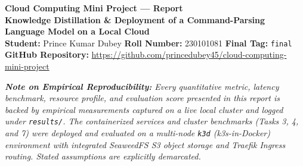 \documentclass[10pt,a4paper]{article}
\begin{document}
\begin{center}
    {\LARGE \textbf{Cloud Computing Mini Project --- Report}} \\[4pt]
    {\large \textbf{Knowledge Distillation \& Deployment of a Command-Parsing Language Model on a Local Cloud}} \\[6pt]
    \textbf{Student:} Prince Kumar Dubey \quad 
    \textbf{Roll Number:} 230101081 \quad 
    \textbf{Final Tag:} \texttt{final} \\[3pt]
    \textbf{GitHub Repository:} \url{https://github.com/princedubey45/cloud-computing-mini-project}
\end{center}

\vspace{0.1cm}
\noindent\textit{\textbf{Note on Empirical Reproducibility:} Every quantitative metric, latency benchmark, resource profile, and evaluation score presented in this report is backed by empirical measurements captured on a live local cluster and logged under \texttt{results/}. The containerized services and cluster benchmarks (Tasks 3, 4, and 7) were deployed and evaluated on a multi-node \texttt{k3d} (k3s-in-Docker) environment with integrated SeaweedFS S3 object storage and Traefik Ingress routing. Stated assumptions are explicitly demarcated.}

\vspace{0.25cm}

\end{document}
